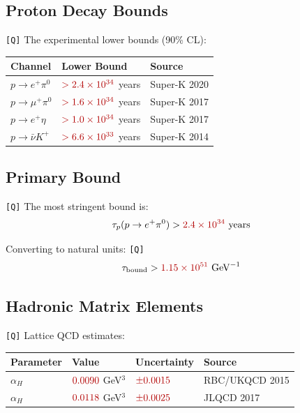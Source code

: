 \documentclass[11pt,a4paper]{article}
\newcommand{\Qval}[1]{\textcolor{red!70!black}{#1}}
\newcommand{\tagQ}{\textcolor{red!70!black}{\texttt{[Q]}}}
\theoremstyle{definition}
\begin{document}
\subsection{Proton Decay Bounds}
\label{app:bounds}

\tagQ{} The experimental lower bounds (90\% CL):

\begin{center}
\begin{tabular}{lll}
\toprule
Channel & Lower Bound & Source \\
\midrule
$p \to e^+ \pi^0$ & $\Qval{> 2.4 \times 10^{34}}$ years & \Qval{Super-K 2020} \\
$p \to \mu^+ \pi^0$ & $\Qval{> 1.6 \times 10^{34}}$ years & \Qval{Super-K 2017} \\
$p \to e^+ \eta$ & $\Qval{> 1.0 \times 10^{34}}$ years & \Qval{Super-K 2017} \\
$p \to \bar{\nu} K^+$ & $\Qval{> 6.6 \times 10^{33}}$ years & \Qval{Super-K 2014} \\
\bottomrule
\end{tabular}
\end{center}

\subsection{Primary Bound}
\label{app:primary-bound}

\tagQ{} The most stringent bound is:
\begin{equation}
\label{eq:primary-bound}
\tau_p(p \to e^+ \pi^0) > \Qval{2.4 \times 10^{34}} \text{ years}
\end{equation}

Converting to natural units: \tagQ{}
\begin{equation}
\label{eq:bound-natural}
\tau_{\text{bound}} > \Qval{1.15 \times 10^{51}} \text{ GeV}^{-1}
\end{equation}

\subsection{Hadronic Matrix Elements}
\label{app:hadronic}

\tagQ{} Lattice QCD estimates:

\begin{center}
\begin{tabular}{llll}
\toprule
Parameter & Value & Uncertainty & Source \\
\midrule
$\alpha_H$ & $\Qval{0.0090}$ GeV$^3$ & $\Qval{\pm 0.0015}$ & \Qval{RBC/UKQCD 2015} \\
$\alpha_H$ & $\Qval{0.0118}$ GeV$^3$ & $\Qval{\pm 0.0025}$ & \Qval{JLQCD 2017} \\
\bottomrule
\end{tabular}
\end{center}
\end{document}
